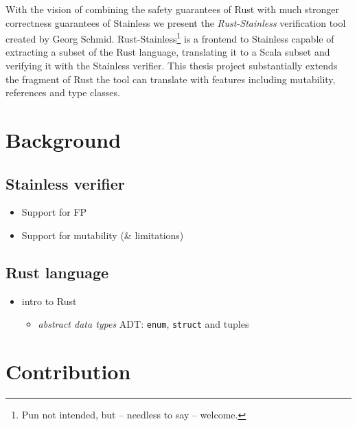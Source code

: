 With the vision of combining the safety guarantees of Rust with much
stronger correctness guarantees of Stainless we present the
\emph{Rust-Stainless} verification tool created by Georg Schmid.
Rust-Stainless\footnote{Pun not intended, but -- needless to say -- welcome.}
is a frontend to Stainless capable of extracting a subset of the Rust
language, translating it to a Scala subset and verifying it with the
Stainless verifier. This thesis project substantially extends the
fragment of Rust the tool can translate with features including
mutability, references and type classes.

\section{Background}

\subsection{Stainless verifier}

\begin{itemize}
\tightlist
\item
  Support for FP
\item
  Support for mutability (\& limitations)
\end{itemize}

\subsection{Rust language}

\begin{itemize}
\tightlist
\item
  intro to Rust

  \begin{itemize}
  \tightlist
  \item
    \emph{abstract data types} ADT: \passthrough{\lstinline!enum!},
    \passthrough{\lstinline!struct!} and tuples
  \end{itemize}
\end{itemize}

\section{Contribution}

